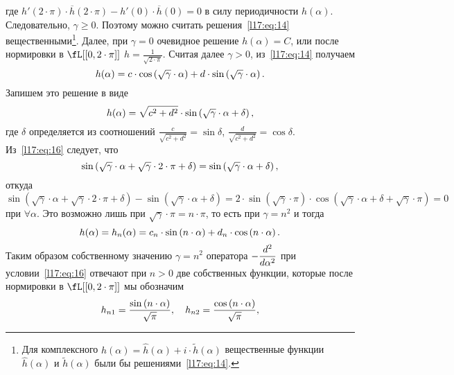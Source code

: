 где $h'(2\cdot\pi)\cdot\overline{h}(2\cdot\pi)-h'(0)\cdot \overline{h}(0)=0$ в силу периодичности $h(\alpha)$. Следовательно, $\gamma\geqslant0$. Поэтому можно считать решения~\eqref{l17:eq:14} вещественными\footnote{Для комплексного $h(\alpha)=\widehat{h}(\alpha)+i\cdot\widetilde{h}(\alpha)$ вещественные функции $\widehat{h}(\alpha)$ и $\widetilde{h}(\alpha)$ были бы решениями~\eqref{l17:eq:14}.}. Далее, при $\gamma=0$ очевидное решение $h(\alpha)=C$, или после нормировки в $\fL[{[0,2\cdot\pi]}]$ $h=\displaystyle\frac{1}{\sqrt{2\cdot\pi}}$. Считая далее $\gamma>0$, из~\eqref{l17:eq:14} получаем 
\begin{equation*}
	\hfill h(\alpha)=c\cdot\cos\left(\sqrt{\gamma}\cdot\alpha\right)+d\cdot\sin\left(\sqrt{\gamma}\cdot\alpha\right).\hfill
\end{equation*} 
Запишем это решение в виде
\begin{equation*}
	\hfill h(\alpha)=\sqrt{c^2+d^2}\cdot\sin\left(\sqrt{\gamma}\cdot\alpha+\delta\right),\hfill
\end{equation*}
где $\delta$ определяется из соотношений $\displaystyle \frac{c}{\sqrt{c^2+d^2}}=\sin\delta$, $\displaystyle \frac{d}{\sqrt{c^2+d^2}}=\cos\delta$. Из~\eqref{l17:eq:16} следует, что 
\begin{equation*}
	\hfill\sin\left(\sqrt{\gamma}\cdot\alpha+\sqrt{\gamma}\cdot2\cdot\pi+\delta\right)=\sin\left(\sqrt{\gamma}\cdot\alpha+\delta\right),\hfill
\end{equation*}
откуда
\begin{equation*}
	\sin\left(\sqrt{\gamma}\cdot\alpha+\sqrt{\gamma}\cdot 2\cdot\pi+\delta\right)-\sin\left(\sqrt{\gamma}\cdot\alpha+\delta\right)=2\cdot\sin\left(\sqrt{\gamma}\cdot\pi\right)\cdot\cos\left(\sqrt{\gamma}\cdot\alpha+\delta+\sqrt{\gamma}\cdot\pi\right)=0
\end{equation*}
при $\forall\alpha$. Это возможно лишь при $\sqrt{\gamma}\cdot \pi=n\cdot \pi$, то есть при $\gamma=n^2$ и тогда 
\begin{equation*}
	\hfill h(\alpha)=h_{n}(\alpha)=c_n\cdot\sin\left(n\cdot \alpha\right)+d_n\cdot\cos\left(n\cdot \alpha\right). \hfill
\end{equation*} 
Таким образом собственному значению $\gamma=n^2$ оператора $\displaystyle-\frac{d^2}{d\alpha^2}$ при условии~\eqref{l17:eq:16} отвечают при $n>0$ две собственных функции, которые после нормировки в $\displaystyle\fL[{[0,2\cdot\pi]}]$ мы обозначим 
\begin{equation*}
	\hfill h_{n1}=\frac{\sin\left(n\cdot \alpha\right)}{\sqrt{\pi}},\quad h_{n2}=\frac{\cos\left(n\cdot \alpha\right)}{\sqrt{\pi}},\hfill
\end{equation*}
